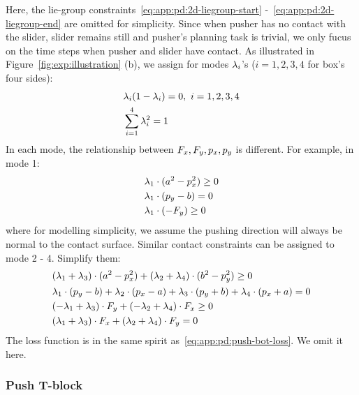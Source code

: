 Here, the lie-group constraints~\eqref{eq:app:pd:2d-liegroup-start} -~\eqref{eq:app:pd:2d-liegroup-end} are omitted for simplicity. 
Since when pusher has no contact with the slider, slider remains still and pusher's planning task is trivial, we only fucus on the time steps when pusher and slider have contact. As illustrated in Figure~\ref{fig:exp:illustration} (b), we assign for modes $\lam{i}$'s ($ i = 1, 2, 3, 4$ for box's four sides):
\begin{align}
    & \lam{i} (1 - \lam{i}) = 0, \ i = 1, 2, 3, 4 \\
    & \sum_{i=1}^4 \lam{i}^2 = 1
\end{align}
In each mode, the relationship between $\Fx, \Fy, \px, \py$ is different. For example, in mode 1:
\begin{align}
    & \lam{1} \cdot (a^2 - \px^2) \ge 0 \\
    & \lam{1} \cdot (\py - b) = 0 \\
    & \lam{1} \cdot (-\Fy) \ge 0 
\end{align}
where for modelling simplicity, we assume the pushing direction will always be normal to the contact surface. Similar contact constraints can be assigned to mode 2 - 4. Simplify them:
\begin{align}
    & (\lam{1} + \lam{3}) \cdot (a^2 - \px^2) + (\lam{2} + \lam{4}) \cdot (b^2 - \py^2) \ge 0 \\
    & \lam{1} \cdot (\py - b) + \lam{2} \cdot (\px - a) + \lam{3} \cdot (\py + b) + \lam{4} \cdot (\px + a) = 0 \\
    & (-\lam{1} + \lam{3}) \cdot \Fy + (-\lam{2} + \lam{4}) \cdot \Fx \ge 0 \\
    & (\lam{1} + \lam{3}) \cdot \Fx + (\lam{2} + \lam{4}) \cdot \Fy = 0 
\end{align}
The loss function is in the same spirit as~\eqref{eq:app:pd:push-bot-loss}. We omit it here.

\subsubsection{Push T-block}
\label{app:pd:push-T-block}

